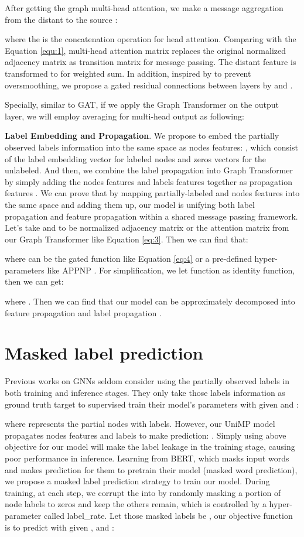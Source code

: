 \documentclass{article} \usepackage{iclr2021_conference,times}
\begin{document}
After getting the graph multi-head attention, we make a message aggregation from the distant  to the source :

where the  is the concatenation operation for  head attention. Comparing with the Equation \ref{equ:1}, multi-head attention  matrix replaces the original normalized adjacency matrix as transition matrix for message passing. The distant feature  is transformed to  for weighted sum. In addition, inspired by \citep{li2019deepgcns,chen2020simple} to prevent oversmoothing, we propose a gated residual connections between layers by  and .

Specially, similar to GAT, if we apply the Graph Transformer on the output layer, we will employ averaging for multi-head output as following: 


{\bf Label Embedding and Propagation}. We propose to embed the partially observed labels information into the same space as nodes features: , which consist of the label embedding vector for labeled nodes and zeros vectors for the unlabeled. And then, we combine the label propagation into Graph Transformer by simply adding the nodes features and labels features together as propagation features . We can prove that by mapping partially-labeled  and nodes features  into the same space and adding them up, our model is unifying both label propagation and feature propagation within a shared message passing framework. Let's take  and  to be normalized adjacency matrix  or the attention matrix from our Graph Transformer like Equation \ref{eq:3}. Then we can find that:

where  can be the gated function like Equation \ref{eq:4} or a pre-defined hyper-parameters like APPNP \citep{klicpera2019predict}. For simplification, we let  function as identity function, then we can get:

where . Then we can find that our model can be approximately decomposed into feature propagation  and label propagation . 

\section{Masked label prediction}

Previous works on GNNs seldom consider using the partially observed labels  in both training and inference stages. They only take those labels information as ground truth target to supervised train their model's parameters  with given  and :

where  represents the partial nodes with labels. However, our UniMP model propagates nodes features and labels to make prediction: . Simply using above objective for our model will make the label leakage in the training stage, causing poor performance in inference. Learning from BERT, which masks input words and makes prediction for them to pretrain their model (masked word prediction), we propose a masked label prediction strategy to train our model. During training, at each step, we corrupt the  into  by randomly masking a portion of node labels to zeros and keep the others remain, which is controlled by a hyper-parameter called label\_rate. Let those masked labels be , our objective function is to predict  with given ,  and :
\end{document}
